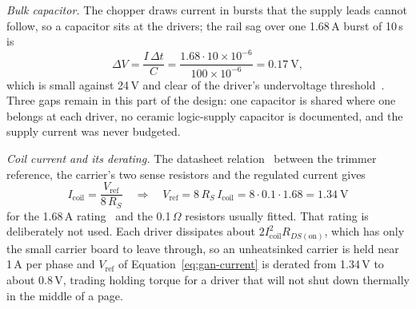 \emph{Bulk capacitor.}
The chopper draws current in bursts that the supply leads cannot follow, so a capacitor sits at the drivers; the rail sag over one 1.68\,A burst of 10\,\textmu s is
\begin{equation}
\Delta V=\frac{I\,\Delta t}{C}=\frac{1.68\cdot10\times10^{-6}}{100\times10^{-6}}=0.17\ \mathrm{V},
\label{eq:gan-bulk}
\end{equation}
which is small against 24\,V and clear of the driver's undervoltage threshold~\cite{a4988ds}.
Three gaps remain in this part of the design: one capacitor is shared where one belongs at each driver, no ceramic logic-supply capacitor is documented, and the supply current was never budgeted.

\emph{Coil current and its derating.}
The datasheet relation~\cite[p.~9]{a4988ds} between the trimmer reference, the carrier's two sense resistors and the regulated current gives
\begin{equation}
I_{\mathrm{coil}}=\frac{V_{\mathrm{ref}}}{8\,R_S}\quad\Longrightarrow\quad V_{\mathrm{ref}}=8\,R_S\,I_{\mathrm{coil}}=8\cdot0.1\cdot1.68=1.34\ \mathrm{V}
\label{eq:gan-current}
\end{equation}
for the 1.68\,A rating~\cite{stepperds} and the 0.1\,$\Omega$ resistors usually fitted.
That rating is deliberately not used.
Each driver dissipates about $2I_{\mathrm{coil}}^2R_{DS(\mathrm{on})}$, which has only the small carrier board to leave through, so an unheatsinked carrier is held near 1\,A per phase and $V_{\mathrm{ref}}$ of Equation~\ref{eq:gan-current} is derated from 1.34\,V to about 0.8\,V, trading holding torque for a driver that will not shut down thermally in the middle of a page.

